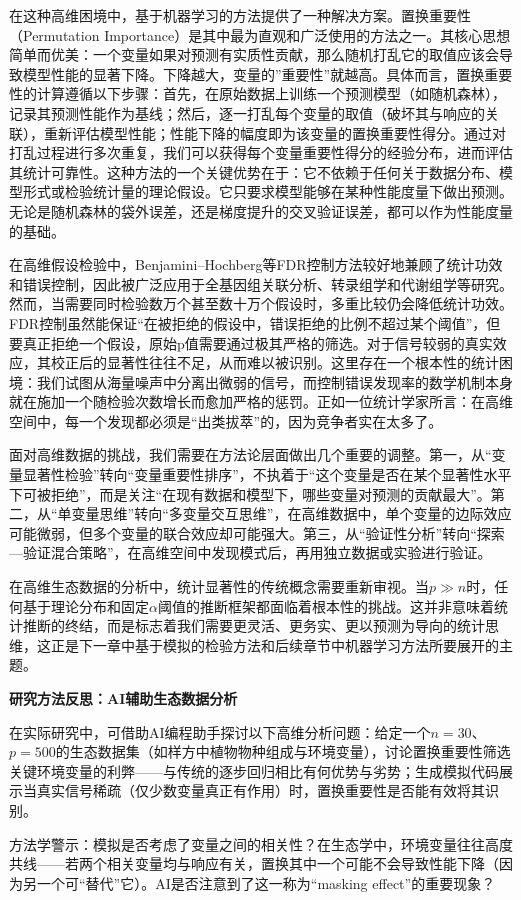 \documentclass[
  twoside,12pt,fontset=none]{ctexbook}
\renewenvironment{quote}{%
  \def\FrameCommand{{\color{quote-border}\vrule width 4pt}\hspace{10pt}}%
  \MakeFramed {\advance\hsize-\width \FrameRestore\noindent\ignorespaces}%
}{%
  \endMakeFramed
}
\begin{document}
在这种高维困境中，基于机器学习的方法提供了一种解决方案。置换重要性（Permutation Importance）是其中最为直观和广泛使用的方法之一。其核心思想简单而优美：一个变量如果对预测有实质性贡献，那么随机打乱它的取值应该会导致模型性能的显著下降。下降越大，变量的''重要性''就越高。具体而言，置换重要性的计算遵循以下步骤：首先，在原始数据上训练一个预测模型（如随机森林），记录其预测性能作为基线；然后，逐一打乱每个变量的取值（破坏其与响应的关联），重新评估模型性能；性能下降的幅度即为该变量的置换重要性得分。通过对打乱过程进行多次重复，我们可以获得每个变量重要性得分的经验分布，进而评估其统计可靠性。这种方法的一个关键优势在于：它不依赖于任何关于数据分布、模型形式或检验统计量的理论假设。它只要求模型能够在某种性能度量下做出预测。无论是随机森林的袋外误差，还是梯度提升的交叉验证误差，都可以作为性能度量的基础。

在高维假设检验中，Benjamini--Hochberg等FDR控制方法较好地兼顾了统计功效和错误控制，因此被广泛应用于全基因组关联分析、转录组学和代谢组学等研究。然而，当需要同时检验数万个甚至数十万个假设时，多重比较仍会降低统计功效。FDR控制虽然能保证``在被拒绝的假设中，错误拒绝的比例不超过某个阈值''，但要真正拒绝一个假设，原始p值需要通过极其严格的筛选。对于信号较弱的真实效应，其校正后的显著性往往不足，从而难以被识别。这里存在一个根本性的统计困境：我们试图从海量噪声中分离出微弱的信号，而控制错误发现率的数学机制本身就在施加一个随检验次数增长而愈加严格的惩罚。正如一位统计学家所言：在高维空间中，每一个发现都必须是``出类拔萃''的，因为竞争者实在太多了。

面对高维数据的挑战，我们需要在方法论层面做出几个重要的调整。第一，从``变量显著性检验''转向``变量重要性排序''，不执着于``这个变量是否在某个显著性水平下可被拒绝''，而是关注``在现有数据和模型下，哪些变量对预测的贡献最大''。第二，从``单变量思维''转向``多变量交互思维''，在高维数据中，单个变量的边际效应可能微弱，但多个变量的联合效应却可能强大。第三，从``验证性分析''转向``探索---验证混合策略''，在高维空间中发现模式后，再用独立数据或实验进行验证。

在高维生态数据的分析中，统计显著性的传统概念需要重新审视。当\(p \gg n\)时，任何基于理论分布和固定\(\alpha\)阈值的推断框架都面临着根本性的挑战。这并非意味着统计推断的终结，而是标志着我们需要更灵活、更务实、更以预测为导向的统计思维，这正是下一章中基于模拟的检验方法和后续章节中机器学习方法所要展开的主题。

\begin{quote}
\textbf{研究方法反思：AI辅助生态数据分析}

在实际研究中，可借助AI编程助手探讨以下高维分析问题：给定一个\(n=30\)、\(p=500\)的生态数据集（如样方中植物物种组成与环境变量），讨论置换重要性筛选关键环境变量的利弊------与传统的逐步回归相比有何优势与劣势；生成模拟代码展示当真实信号稀疏（仅少数变量真正有作用）时，置换重要性是否能有效将其识别。

方法学警示：模拟是否考虑了变量之间的相关性？在生态学中，环境变量往往高度共线------若两个相关变量均与响应有关，置换其中一个可能不会导致性能下降（因为另一个可``替代''它）。AI是否注意到了这一称为``masking effect''的重要现象？
\end{quote}
\end{document}
